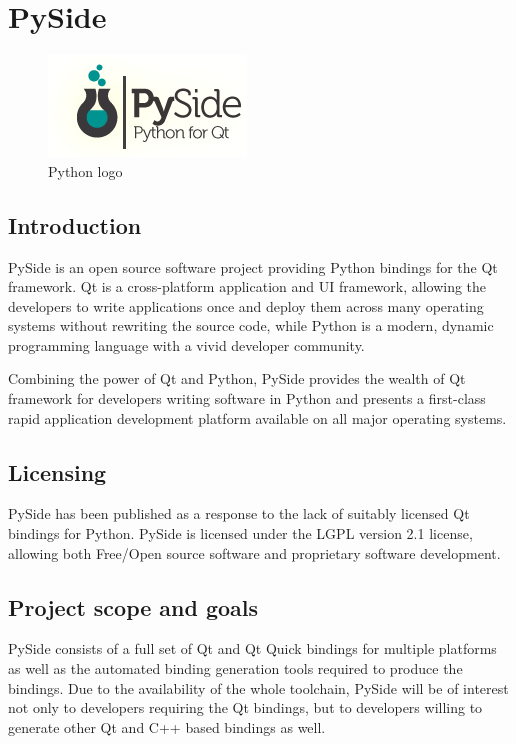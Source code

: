 \section{PySide}

\begin{figure}[h]
\centering \includegraphics[scale=0.7]{images/Pyside.png}
\caption{Python logo}
\end{figure}

\subsection{Introduction}
PySide is an open source software project providing Python bindings for the Qt framework. Qt is a cross-platform application and UI framework, allowing the developers to write applications once and deploy them across many operating systems without rewriting the source code, while Python is a modern, dynamic programming language with a vivid developer community.

Combining the power of Qt and Python, PySide provides the wealth of Qt framework for developers writing software in Python and presents a first-class rapid application development platform available on all major operating systems.

\subsection{Licensing}
PySide has been published as a response to the lack of suitably licensed Qt bindings for Python. PySide is licensed under the LGPL version 2.1 license, allowing both Free/Open source software and proprietary software development.

\subsection{Project scope and goals}
PySide consists of a full set of Qt and Qt Quick bindings for multiple platforms as well as the automated binding generation tools required to produce the bindings. Due to the availability of the whole toolchain, PySide will be of interest not only to developers requiring the Qt bindings, but to developers willing to generate other Qt and C++ based bindings as well.

